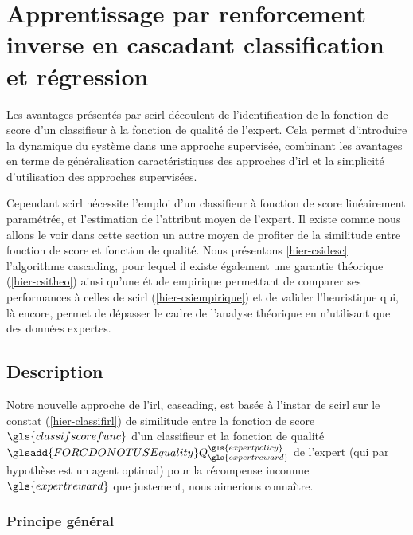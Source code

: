 \documentclass[frenchb,a4paper,justified,notoc]{tufte-book}
\newcommand{\classifscorefunc}{\gls{classifscorefunc}}
\newcommand{\expertreward}{\gls{expertreward}}
\newcommand{\expertpolicy}{\gls{expertpolicy}}
\newcommand{\quality}[2]{\ensuremath{\glsadd{FORCDONOTUSEquality}Q^{#1}_{#2}}}
\begin{document}
\chapter{Apprentissage par renforcement inverse en cascadant classification et régression}
\label{sec-6}
\label{hier-cascading}


Les avantages présentés par \gls{scirl} découlent de l'identification de la fonction de score d'un classifieur à la fonction de qualité de l'expert. Cela permet d'introduire la dynamique du système dans une approche supervisée, combinant les avantages en terme de généralisation caractéristiques des approches d'\gls{irl} et la simplicité d'utilisation des approches supervisées.

Cependant \gls{scirl} nécessite l'emploi d'un classifieur à fonction de score linéairement paramétrée, et l'estimation de l'attribut moyen de l'expert. Il existe comme nous allons le voir dans cette section un autre moyen de profiter de la similitude entre fonction de score et fonction de qualité. Nous présentons \autoref{hier-csidesc} l'algorithme \gls{cascading}, pour lequel il existe également une garantie théorique (\autoref{hier-csitheo}) ainsi qu'une étude empirique permettant de comparer ses performances à celles de \gls{scirl} (\autoref{hier-csiempirique}) et de valider l'heuristique qui, là encore, permet de dépasser le cadre de l'analyse théorique en n'utilisant que des données expertes.
\section{Description}
\label{sec-6-1}
\label{hier-csidesc}


   Notre nouvelle approche de l'\gls{irl}, \gls{cascading}, est basée à l'instar de \gls{scirl} sur le constat (\autoref{hier-classifirl}) de similitude entre la fonction de score $\classifscorefunc$ d'un classifieur et la fonction de qualité $\quality{\expertpolicy}{\expertreward}$ de l'expert (qui par hypothèse est un agent optimal) pour la récompense inconnue $\expertreward$ que justement, nous aimerions connaître.
\subsection{Principe général}
\label{sec-6-1-1}
\end{document}
